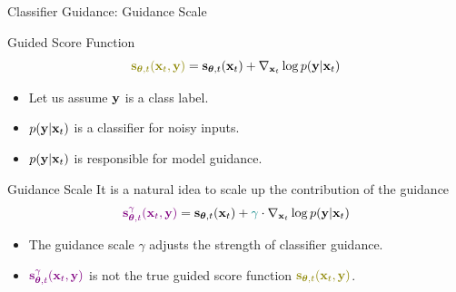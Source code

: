 \documentclass{beamer}
\begin{document}
\begin{frame}{Classifier Guidance: Guidance Scale}
	\begin{block}{Guided Score Function}
		\vspace{-0.3cm}
		\[
			{\color{olive}\bs_{\btheta, t}(\bx_t, \by)} = \bs_{\btheta, t}(\bx_t) + \nabla_{\bx_t} \log p(\by | \bx_t)
		\]
		\vspace{-0.5cm}
	\end{block}
	\eqpause
	\begin{itemize}
		\item Let us assume $\mathbf{y}$ is a class label.
		\item $p(\mathbf{y} | \mathbf{x}_t)$ is a classifier for noisy inputs.
		\item $p(\mathbf{y} | \mathbf{x}_t)$ is responsible for model guidance.
	\end{itemize}
	\eqpause
	\begin{block}{Guidance Scale}
		It is a natural idea to scale up the contribution of the guidance
		\[
			{\color{violet}\mathbf{s}^{\gamma}_{\boldsymbol{\theta}, t}(\mathbf{x}_t, \mathbf{y})} = \mathbf{s}_{\boldsymbol{\theta}, t}(\mathbf{x}_t) + {\color{teal}\gamma} \cdot \nabla_{\mathbf{x}_t} \log p(\mathbf{y} | \mathbf{x}_t)
		\]
		\eqpause
		\vspace{-0.5cm}
		\begin{itemize}
			\item The {\color{teal}guidance scale $\gamma$} adjusts the strength of classifier guidance.
			\item ${\color{violet}\mathbf{s}^{\gamma}_{\boldsymbol{\theta}, t}(\mathbf{x}_t, \mathbf{y})}$ is not the true guided score function ${\color{olive}\bs_{\btheta, t}(\bx_t, \by)}$.
		\end{itemize}
	\end{block}
\end{frame}
\end{document}
